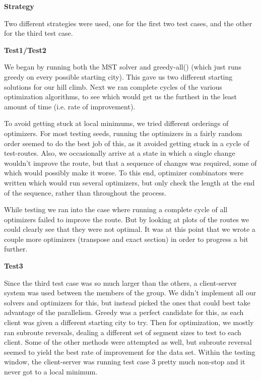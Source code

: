 \documentclass[letterpaper,10pt,titlepage,fleqn]{article}
\begin{document}
\begin{Large}
\textbf{Strategy} \\
\end{Large}

Two different strategies were used, one for the first two test cases, and the other for the third test case.

\textbf{Test1/Test2}

We began by running both the MST solver and greedy-all() (which just runs greedy on every possible starting city). This gave us two different starting solutions for our hill climb. Next we ran complete cycles of the various optimization algorithms, to see which would get us the furthest in the least amount of time (i.e. rate of improvement). 

To avoid getting stuck at local minimums, we tried different orderings of optimizers. For most testing seeds, running the optimizers in a fairly random order seemed to do the best job of this, as it avoided getting stuck in a cycle of test-routes. Also, we occasionally arrive at a state in which a single change wouldn’t improve the route, but that a sequence of changes was required, some of which would possibly make it worse. To this end, optimizer combinators were written which would run several optimizers, but only check the length at the end of the sequence, rather than throughout the process.

While testing we ran into the case where running a complete cycle of all optimizers failed to improve the route. But by looking at plots of the routes we could clearly see that they were not optimal. It was at this point that we wrote a couple more optimizers (transpose and exact section) in order to progress a bit further.

\textbf{Test3}

Since the third test case was so much larger than the others, a client-server system was used between the members of the group. We didn’t implement all our solvers and optimizers for this, but instead picked the ones that could best take advantage of the parallelism. Greedy was a perfect candidate for this, as each client was given a different starting city to try. Then for optimization, we mostly ran subroute reversals, dealing a different set of segment sizes to test to each client. Some of the other methods were attempted as well, but subroute reversal seemed to yield the best rate of improvement for the data set. Within the testing window, the client-server was running test case 3 pretty much non-stop and it never got to a local minimum. \\
\end{document}
